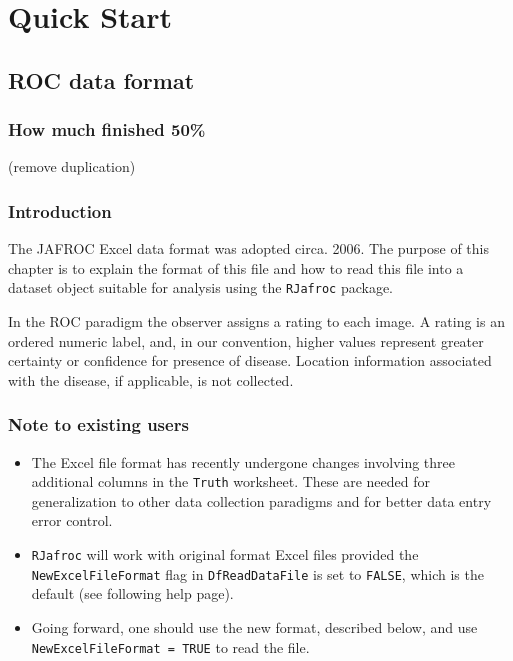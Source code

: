 \documentclass[
]{book}
\begin{document}
\hypertarget{part-quick-start}{%
\part*{Quick Start}\label{part-quick-start}}

\hypertarget{quick-start-roc}{%
\chapter{ROC data format}\label{quick-start-roc}}

\hypertarget{quick-start-roc-how-much-finished}{%
\section{How much finished 50\%}\label{quick-start-roc-how-much-finished}}

(remove duplication)

\hypertarget{quick-start-roc-intro}{%
\section{Introduction}\label{quick-start-roc-intro}}

The JAFROC Excel data format was adopted circa. 2006. The purpose of this chapter is to explain the format of this file and how to read this file into a dataset object suitable for analysis using the \texttt{RJafroc} package.

In the ROC paradigm the observer assigns a rating to each image. A rating is an ordered numeric label, and, in our convention, higher values represent greater certainty or confidence for presence of disease. Location information associated with the disease, if applicable, is not collected.

\hypertarget{quick-start-roc-note}{%
\section{Note to existing users}\label{quick-start-roc-note}}

\begin{itemize}
\item
  The Excel file format has recently undergone changes involving three additional columns in the \texttt{Truth} worksheet. These are needed for generalization to other data collection paradigms and for better data entry error control.
\item
  \texttt{RJafroc} will work with original format Excel files provided the \texttt{NewExcelFileFormat} flag in \texttt{DfReadDataFile} is set to \texttt{FALSE}, which is the default (see following help page).
\item
  Going forward, one should use the new format, described below, and use \texttt{NewExcelFileFormat\ =\ TRUE} to read the file.
\end{itemize}
\end{document}

